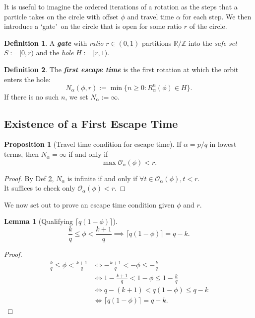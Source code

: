 \documentclass{article}
\theoremstyle{definition}
\newtheorem{definition}{Definition}[section]
\newtheorem{proposition}{Proposition}[section]
\newtheorem{lemma}{Lemma}[section]
\newcommand{\onRatio}{ r }
\newcommand{\safeSet}{ S }
\newcommand{\holeSet}{ H }
\newcommand{\travelTime}{ \alpha }
\newcommand{\phase}{ \phi }
\newcommand{\fatalIndexFn}[3]{ N_#1(#2,#3) }
\newcommand{\fatalIndex}[1]{N_#1}
\newcommand{\orbit}[2]{ \mathcal{O}_#1(#2) }
\newcommand{\rotation}[3]{ R_#1^#2(#3) }
\begin{document}
It is useful to imagine the ordered iterations of a rotation as the steps that a particle takes on the circle with offset $\phase$ and travel time $\travelTime$ for each step. We then introduce a \lq gate\rq \ on the circle that is open for some ratio $r$ of the circle.

\begin{definition}
A \textit{\textbf{gate}} with \textit{ratio} $\onRatio\in(0,1)$ partitions $\mathbb{R}/\mathbb{Z}$ into the \textit{safe set} $\safeSet:=[0,r)$ and the \textit{hole} $\holeSet:=[r,1)$.
\label{def:gate}
\end{definition}

\begin{definition}
The \textit{\textbf{first escape time}} is the first rotation at which the orbit enters the hole:
\[
\fatalIndexFn{\travelTime}{\phase}{\onRatio}:=\min\{n \geq 0: \rotation{\travelTime}{n}{\phase}\in \holeSet\}.
\]
If there is no such $n$, we set $\fatalIndex{\travelTime}:=\infty$.
\label{def:fatal_index}
\end{definition}

\subsection{Existence of a First Escape Time}

\begin{proposition}[Travel time condition for escape time]
\label{prop:travel_time_condition}
If $\travelTime=p/q$ in lowest terms, then $\fatalIndex{\travelTime} = \infty$ if and only if
\[
    \max\orbit{\travelTime}{\phase} < \onRatio.
\]
\begin{proof}
By Def \ref{def:fatal_index}, $\fatalIndex{\travelTime}$ is infinite if and only if  $\forall t \in \orbit{\travelTime}{\phase},t<\onRatio$. \\
It suffices to check only $\orbit{\travelTime}{\phase} < r$.
\end{proof}
\end{proposition}
\newpage
\noindent
We now set out to prove an escape time condition given $\phase$ and $\onRatio$.

\begin{lemma}[Qualifying $\lceil q(1-\phase)\rceil$]
\[
\frac{k}{q}\le\phase<\frac{k+1}{q} \implies \lceil q(1-\phase)\rceil=q-k.
\]
\begin{proof}
\label{lem:qualifying}
\begin{align*}
    \frac{k}{q}\le\phase<\frac{k+1}{q} & \iff -\frac{k+1}{q}<-\phase\le-\frac{k}{q}\\
    & \iff 1-\frac{k+1}{q}<1-\phase\le1-\frac{k}{q}\\
    & \iff q-(k+1)<q(1-\phase)\le q-k\\
    & \iff \lceil q(1-\phase)\rceil=q-k.
\end{align*}
\end{proof}
\end{lemma}
\end{document}
